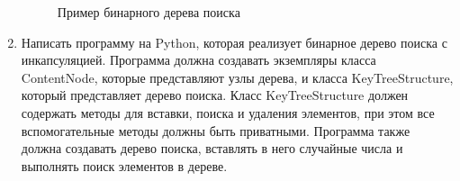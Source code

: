 \begin{enumerate}
\begin{figure}[h]
\centering
{}
\caption{Пример бинарного дерева поиска}
\end{figure}

\item Написать программу на Python, которая реализует бинарное дерево поиска с инкапсуляцией. Программа должна создавать экземпляры класса ContentNode, которые представляют узлы дерева, и класса KeyTreeStructure, который представляет дерево поиска. Класс KeyTreeStructure должен содержать методы для вставки, поиска и удаления элементов, при этом все вспомогательные методы должны быть приватными. Программа также должна создавать дерево поиска, вставлять в него случайные числа и выполнять поиск элементов в дереве.


\end{enumerate}
